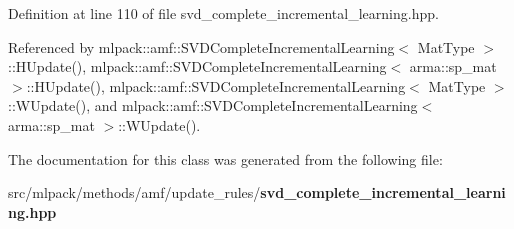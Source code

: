 Definition at line 110 of file svd\-\_\-complete\-\_\-incremental\-\_\-learning.\-hpp.



Referenced by mlpack\-::amf\-::\-S\-V\-D\-Complete\-Incremental\-Learning$<$ Mat\-Type $>$\-::\-H\-Update(), mlpack\-::amf\-::\-S\-V\-D\-Complete\-Incremental\-Learning$<$ arma\-::sp\-\_\-mat $>$\-::\-H\-Update(), mlpack\-::amf\-::\-S\-V\-D\-Complete\-Incremental\-Learning$<$ Mat\-Type $>$\-::\-W\-Update(), and mlpack\-::amf\-::\-S\-V\-D\-Complete\-Incremental\-Learning$<$ arma\-::sp\-\_\-mat $>$\-::\-W\-Update().



The documentation for this class was generated from the following file\-:\begin{DoxyCompactItemize}
\item 
src/mlpack/methods/amf/update\-\_\-rules/{\bf svd\-\_\-complete\-\_\-incremental\-\_\-learning.\-hpp}\end{DoxyCompactItemize}
